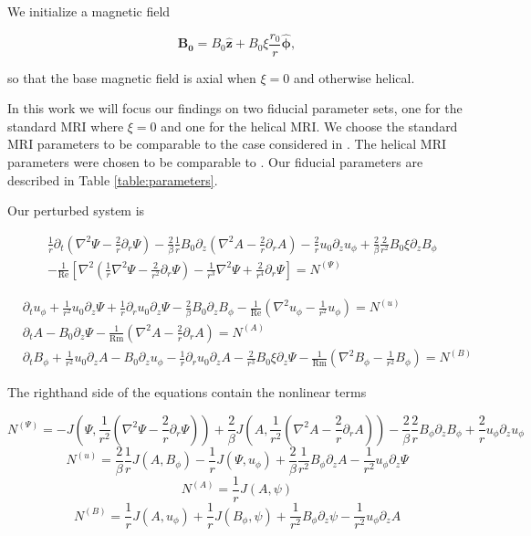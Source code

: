 \documentclass{emulateapj}
\newcommand{\beq}{\begin{equation}}
\newcommand{\eeq}{\end{equation}}
\newcommand{\citei}[1]{\citeauthor{#1} \citeyear{#1}}
\newcommand\reye{\mathrm{Re}}
\newcommand\reym{\mathrm{Rm}}
\newcommand{\uphi}{\ensuremath{u_\phi}}
\newcommand{\phihat}{\ensuremath{\mathbf{\hat{\phi}}}}
\newcommand{\zhat}{\ensuremath{\mathbf{\hat{z}}}}
\begin{document}
We initialize a magnetic field 

\beq
\label{eq:baseB0}
\mathbf{B_0} = B_0 \zhat + B_0 \xi \frac{r_0}{r} \phihat,
\eeq

so that the base magnetic field is axial when $\xi = 0$ and otherwise helical. 

In this work we will focus our findings on two fiducial parameter sets, one for the standard MRI where $\xi = 0$ and one for the helical MRI. We choose the standard MRI parameters to be comparable to the case considered in \citei{Goodman:2002ix}. The helical MRI parameters were chosen to be comparable to \citei{Hollerbach:2005tr}. Our fiducial parameters are described in Table \ref{table:parameters}.

\begin{widetext}
Our perturbed system is 

\begin{align}
& \frac{1}{r}\partial_t (\nabla^2 \Psi - \frac{2}{r} \partial_r \Psi) - \frac{2}{\beta} \frac{1}{r}B_0 \partial_z (\nabla^2 A - \frac{2}{r} \partial_r A) - \frac{2}{r}u_0 \partial_z u_\phi + \frac{2}{\beta} \frac{2}{r^2}B_0 \xi \partial_z B_\phi \nonumber\\
& - \frac{1}{\reye} \left[ \nabla^2 (\frac{1}{r} \nabla^2 \Psi - \frac{2}{r^2}\partial_r\Psi) - \frac{1}{r^3} \nabla^2 \Psi + \frac{2}{r^4}\partial_r\Psi\right] = N^{(\Psi)} \label{eq:Psi_perturbed}
\end{align}

\begin{align}
& \partial_t \uphi + \frac{1}{r^2} u_0 \partial_z \Psi + \frac{1}{r} \partial_r u_0 \partial_z \Psi - \frac{2}{\beta} B_0 \partial_z B_\phi - \frac{1}{\reye} ( \nabla^2 \uphi - \frac{1}{r^2} \uphi ) = N^{(u)} \label{eq:uphi_perturbed} \\
& \partial_t A - B_0 \partial_z \Psi - \frac{1}{\reym} ( \nabla^2 A - \frac{2}{r} \partial_r A )= N^{(A)}  \label{eq:A_perturbed}\\
  \label{eq:Bphi_perturbed}
& \partial_t B_\phi + \frac{1}{r^2} u_0 \partial_z A - B_0 \partial_z u_\phi - \frac{1}{r} \partial_r u_0 \partial_z A - \frac{2}{r^3} B_0 \xi \partial_z \Psi - \frac{1}{\reym} (\nabla^2 B_\phi - \frac{1}{r^2} B_\phi ) = N^{(B)}
\end{align}

The righthand side of the equations contain the nonlinear terms

\beq
N^{(\Psi)} = - J(\Psi, \frac{1}{r^2} ( \nabla^2 \Psi - \frac{2}{r} \partial_r\Psi) ) + \frac{2}{\beta} J(A, \frac{1}{r^2} ( \nabla^2 A - \frac{2}{r} \partial_rA) ) - \frac{2}{\beta} \frac{2}{r}B_\phi \partial_z B_\phi  + \frac{2}{r} u_\phi \partial_z u_\phi 
\eeq
\beq
N^{(u)} = \frac{2}{\beta} \frac{1}{r} J(A, B_\phi) - \frac{1}{r} J(\Psi, \uphi) + \frac{2}{\beta}\frac{1}{r^2} B_\phi \partial_z A - \frac{1}{r^2} \uphi \partial_z \Psi 
\eeq
\beq
N^{(A)} = \frac{1}{r} J(A, \psi)
\eeq
\beq
N^{(B)} = \frac{1}{r} J(A, \uphi) + \frac{1}{r} J(B_\phi, \psi) + \frac{1}{r^2} B_\phi \partial_z \psi - \frac{1}{r^2} \uphi \partial_z A 
\label{eq:nonlinear_B}
\eeq
\end{widetext}
\end{document}
